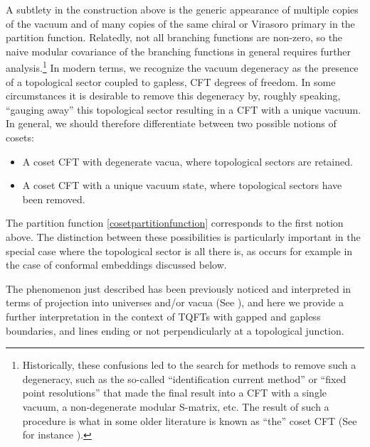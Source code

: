 \documentclass[11pt]{article}
\numberwithin{equation}{section}
\begin{document}
A subtlety in the construction above is the generic appearance of multiple copies of the vacuum and of many copies of the same chiral or Virasoro primary in the partition function. Relatedly, not all branching functions are non-zero, so the naive modular covariance of the branching functions in general requires further analysis.\footnote{\label{footnoteidentificationcurrent} Historically, these confusions led to the search for methods to remove such a degeneracy, such as the so-called ``identification current method'' or ``fixed point resolutions'' that made the final result into a CFT with a single vacuum, a non-degenerate modular S-matrix, etc. The result of such a procedure is what in some older literature is known as ``the'' coset CFT (See for instance \cite{DiFrancesco:1997nk, Fuchs:1995tq, Gepner:1989jq,Schellekens:1989uf}).} In modern terms, we recognize the vacuum degeneracy as the presence of a topological sector coupled to gapless, CFT degrees of freedom. In some circumstances it is desirable to remove this degeneracy by, roughly speaking, ``gauging away'' this topological sector resulting in a CFT with a unique vacuum. In general, we should therefore differentiate between two possible notions of cosets:
\begin{itemize}
    \item A coset CFT with degenerate vacua, where topological sectors are retained.
    \item A coset CFT with a unique vacuum state, where topological sectors have been removed.
\end{itemize}
The partition function \eqref{cosetpartitionfunction} corresponds to the first notion above. The distinction between these possibilities is particularly important in the special case where the topological sector is all there is, as occurs for example in the case of conformal embeddings discussed below.  

The phenomenon just described has been previously noticed and interpreted in terms of projection into universes and/or vacua (See \cite{Delmastro:2021otj, Komargodski:2020mxz}), and here we provide a further interpretation in the context of TQFTs with gapped and gapless boundaries, and lines ending or not perpendicularly at a topological junction.
\end{document}

